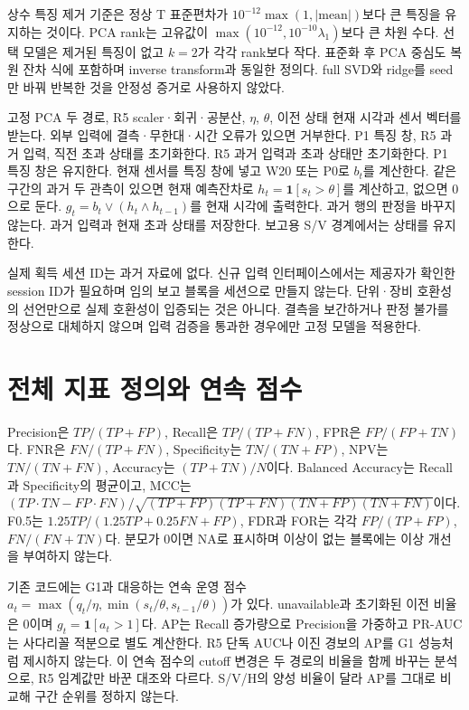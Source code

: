 \documentclass{article}
\newcommand{\ind}{\mathbf{1}}
\begin{document}
상수 특징 제거 기준은 정상 T 표준편차가 $10^{-12}\max(1,|\mathrm{mean}|)$보다 큰 특징을 유지하는 것이다. PCA rank는 고유값이 $\max(10^{-12},10^{-10}\lambda_1)$보다 큰 차원 수다. 선택 모델은 제거된 특징이 없고 $k=2$가 각각 rank보다 작다. 표준화 후 PCA 중심도 복원 잔차 식에 포함하며 inverse transform과 동일한 정의다. full SVD와 ridge를 seed만 바꿔 반복한 것을 안정성 증거로 사용하지 않았다.

\begin{algorithm}[h]\caption{완전한 센서 입력에서 선정 G1의 온라인 갱신}\begin{algorithmic}[1]
\REQUIRE 고정 PCA 두 경로, R5 scaler·회귀·공분산, $\eta$, $\theta$, 이전 상태
\STATE 현재 시각과 센서 벡터를 받는다. 외부 입력에 결측·무한대·시간 오류가 있으면 거부한다.
\STATE P1 특징 창, R5 과거 입력, 직전 초과 상태를 초기화한다.
\STATE R5 과거 입력과 초과 상태만 초기화한다. P1 특징 창은 유지한다.
\ENDIF
\STATE 현재 센서를 특징 창에 넣고 W20 또는 P0로 $b_t$를 계산한다.
\STATE 같은 구간의 과거 두 관측이 있으면 현재 예측잔차로 $h_t=\ind[s_t>\theta]$를 계산하고, 없으면 0으로 둔다.
\STATE $g_t=b_t\lor(h_t\land h_{t-1})$를 현재 시각에 출력한다. 과거 행의 판정을 바꾸지 않는다.
\STATE 과거 입력과 현재 초과 상태를 저장한다. 보고용 S/V 경계에서는 상태를 유지한다.
\end{algorithmic}\end{algorithm}

실제 획득 세션 ID는 과거 자료에 없다. 신규 입력 인터페이스에서는 제공자가 확인한 session ID가 필요하며 임의 보고 블록을 세션으로 만들지 않는다. 단위·장비 호환성의 선언만으로 실제 호환성이 입증되는 것은 아니다. 결측을 보간하거나 판정 불가를 정상으로 대체하지 않으며 입력 검증을 통과한 경우에만 고정 모델을 적용한다.

\section{전체 지표 정의와 연속 점수}
Precision은 $TP/(TP+FP)$, Recall은 $TP/(TP+FN)$, FPR은 $FP/(FP+TN)$다. FNR은 $FN/(TP+FN)$, Specificity는 $TN/(TN+FP)$, NPV는 $TN/(TN+FN)$, Accuracy는 $(TP+TN)/N$이다. Balanced Accuracy는 Recall과 Specificity의 평균이고, MCC는 $(TP\cdot TN-FP\cdot FN)/\sqrt{(TP+FP)(TP+FN)(TN+FP)(TN+FN)}$이다. F0.5는 $1.25TP/(1.25TP+0.25FN+FP)$, FDR과 FOR는 각각 $FP/(TP+FP)$, $FN/(FN+TN)$다. 분모가 0이면 NA로 표시하며 이상이 없는 블록에는 이상 개선을 부여하지 않는다.

기존 코드에는 G1과 대응하는 연속 운영 점수 $a_t=\max(q_t/\eta,\min(s_t/\theta,s_{t-1}/\theta))$가 있다. unavailable과 초기화된 이전 비율은 0이며 $g_t=\ind[a_t>1]$다. AP는 Recall 증가량으로 Precision을 가중하고 PR-AUC는 사다리꼴 적분으로 별도 계산한다. R5 단독 AUC나 이진 경보의 AP를 G1 성능처럼 제시하지 않는다. 이 연속 점수의 cutoff 변경은 두 경로의 비율을 함께 바꾸는 분석으로, R5 임계값만 바꾼 대조와 다르다. S/V/H의 양성 비율이 달라 AP를 그대로 비교해 구간 순위를 정하지 않는다.
\end{document}
